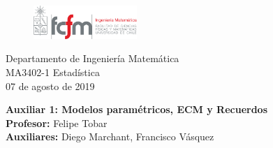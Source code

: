 \documentclass[11pt]{article}
\newcommand{\aux}[4]{\Large \textbf{Auxiliar #1: #2}\\ \normalsize \textbf{Profesor: } #3\\ \textbf{Auxiliares: }#4}
\begin{document}
\begin{figure} %
    \vspace{-5mm}
    \includegraphics[width=0.35\textwidth]{dim.pdf}
\end{figure}
\noindent Departamento de Ingeniería Matemática\\ 
MA3402-1 Estadística\\ 
07 de agosto de 2019

\hfill\break
\begin{center}
\aux{1}{Modelos paramétricos, ECM y Recuerdos}{Felipe Tobar}{Diego Marchant, Francisco Vásquez}
\end{center}
\end{document}
